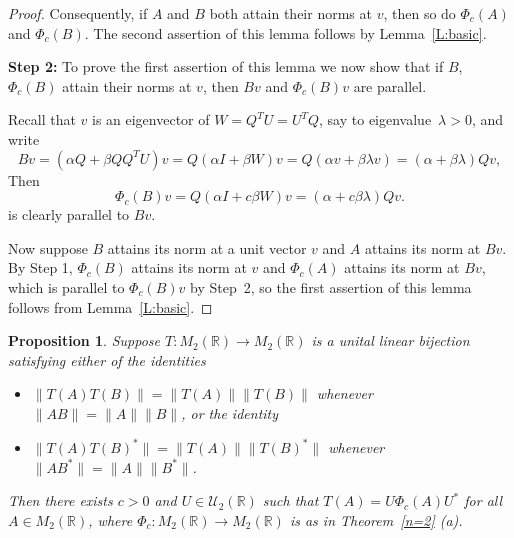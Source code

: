 \documentclass[11pt]{article}
\newtheorem{proposition}[theorem]{Proposition}
\numberwithin{equation}{section}
\def\IR{{\mathbb R}}
\begin{document}
\begin{proof}
	Consequently, if $A$ and $B$ both attain their norms at $v$, then so do $\Phi_c(A)$ and $\Phi_c(B)$.  The second assertion of this lemma follows by Lemma~\ref{L:basic}.
	\smallskip

	\textbf{Step 2:} To prove the first assertion of this lemma we now show that if $B$, $\Phi_c(B)$ attain their norms at $v$, then $Bv$ and $\Phi_c(B)v$ are parallel.

	Recall that $v$ is an eigenvector of $W=Q^TU=U^T Q$, say to eigenvalue~$\lambda > 0$, and write
	\[
	Bv = (\alpha Q + \beta Q Q^T U)v = Q(\alpha I + \beta W)v= Q(\alpha v + \beta \lambda v) = (\alpha + \beta \lambda) Qv,
	\]
	Then
	\[
	\Phi_c(B)v = Q(\alpha I + c \beta W)v = (\alpha + c \beta \lambda) Qv.
	\]
	is clearly parallel to $Bv$.

	Now suppose $B$ attains its norm at a unit vector $v$ and $A$ attains its norm at $Bv$.  By Step 1, $\Phi_c(B)$ attains its norm at $v$ and $\Phi_c(A)$ attains its norm at $Bv$, which is parallel to $\Phi_c(B)v$ by Step~2, so the first assertion of this lemma follows from Lemma~\ref{L:basic}.
\end{proof}

\begin{proposition}\label{P:n=2,real}
	Suppose $T\colon M_2(\IR) \rightarrow M_2(\IR)$ is a unital linear bijection satisfying either of the identities
	\begin{itemize}
		\item[{\rm (i)}] $\|T(A)T(B)\| = \|T(A)\| \|T(B)\|$ whenever $\|AB\| = \|A\| \|B\|$, or the identity
		\item[{\rm (ii)}] $\|T(A)T(B)^*\| = \|T(A)\| \|T(B)^*\|$ whenever $\|AB^*\| = \|A\| \|B^*\|$.
	\end{itemize}
	Then there exists $c>0$ and $U \in {\mathcal U}_2(\IR)$ such that $T(A) = U \Phi_c(A) U^*$ for all $A \in M_2(\IR)$, where $\Phi_c\colon M_2(\IR) \rightarrow M_2(\IR)$ is as in Theorem~\ref{n=2} {\rm (a)}.
 \end{proposition}
\end{document}
